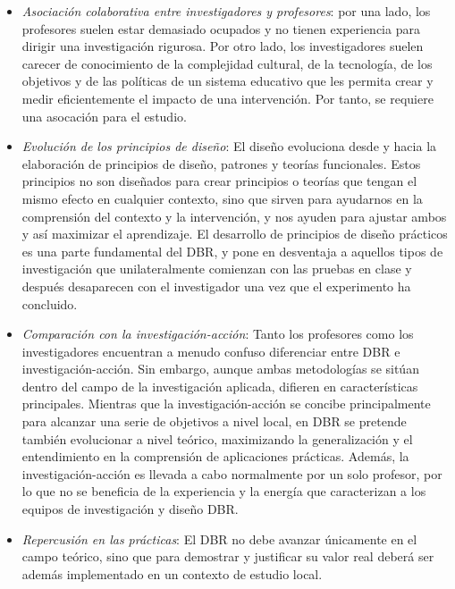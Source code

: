 \begin{itemize}
\item \emph{Asociación colaborativa entre investigadores y profesores}: por una lado, los profesores suelen estar demasiado ocupados y no tienen experiencia para dirigir una investigación rigurosa. Por otro lado, los investigadores suelen carecer de conocimiento de la complejidad cultural, de la tecnología, de los objetivos y de las políticas de un sistema educativo que les permita crear y medir eficientemente el impacto de una intervención. Por tanto, se requiere una asocación para el estudio.
\item \emph{Evolución de los principios de diseño}: El diseño evoluciona desde y hacia la elaboración de principios de diseño, patrones y teorías funcionales. Estos principios no son diseñados para crear principios o teorías que tengan el mismo efecto en cualquier contexto, sino que sirven para ayudarnos en la comprensión del contexto y la intervención, y nos ayuden para ajustar ambos y así maximizar el aprendizaje.  El desarrollo de principios de diseño prácticos es una parte fundamental del DBR, y pone en desventaja a aquellos tipos de investigación que unilateralmente comienzan con las pruebas en clase y después desaparecen con el investigador una vez que el experimento ha concluido.
\item \emph{Comparación con la investigación-acción}: Tanto los profesores como los investigadores encuentran a menudo confuso diferenciar entre DBR e investigación-acción. Sin embargo, aunque ambas metodologías se sitúan dentro del campo de la investigación aplicada, difieren en características principales. Mientras que la investigación-acción se concibe principalmente para alcanzar una serie de objetivos a nivel local, en DBR se pretende también evolucionar a nivel teórico, maximizando la generalización y el entendimiento en la comprensión de aplicaciones prácticas. Además, la investigación-acción es llevada a cabo normalmente por un solo profesor, por lo que no se beneficia de la experiencia y la energía que caracterizan a los equipos de investigación y diseño DBR.
\item \emph{Repercusión en las prácticas}: El DBR no debe avanzar únicamente en el campo teórico, sino que para demostrar y justificar su valor real deberá ser además implementado en un contexto de estudio local.
\end{itemize}